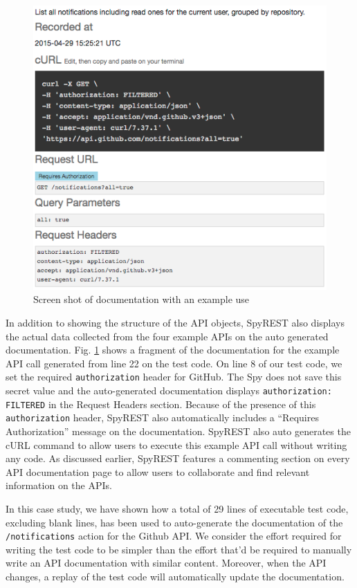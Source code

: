 \documentclass[conference]{IEEEtran}
\begin{document}
\begin{figure}[!tbh]
  \centering
  \includegraphics[width=\linewidth]{notification_example.png}
  \caption{Screen shot of documentation with an example use}
  \label{fig:notification_example}
\end{figure}

In addition to showing the structure of the API objects, SpyREST also displays the actual data collected from the four example APIs on the auto generated documentation. Fig. \ref{fig:notification_example} shows a fragment of the documentation for the example API call generated from line 22 on the test code. On line 8 of our test code, we set the required \texttt{authorization} header for GitHub. The Spy does not save this secret value and the auto-generated documentation displays \texttt{authorization: FILTERED} in the Request Headers section. Because of the presence of this \texttt{authorization} header, SpyREST also automatically includes a ``Requires Authorization'' message on the documentation. SpyREST also auto generates the cURL command to allow users to execute this example API call without writing any code. As discussed earlier, SpyREST features a commenting section on every API documentation page to allow users to collaborate and find relevant information on the APIs.

In this case study, we have shown how a total of 29 lines of executable test code, excluding blank lines, has been used to auto-generate the documentation of the \texttt{/notifications} action for the Github API. We consider the effort required for writing the test code to be simpler than the effort that'd be required to manually write an API documentation with similar content. Moreover, when the API changes, a replay of the test code will automatically update the documentation.
\end{document}
